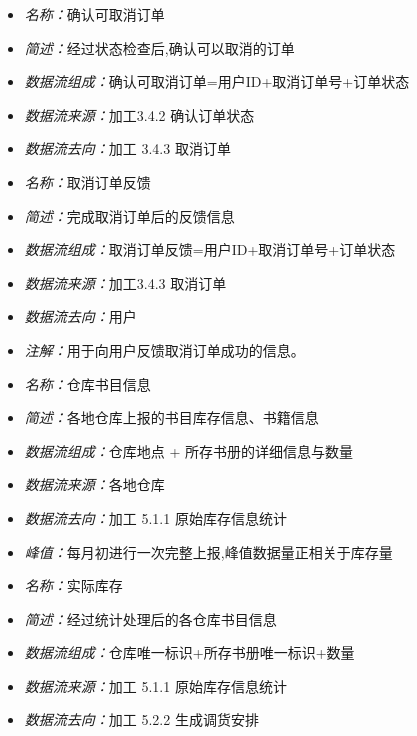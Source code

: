\documentclass{article}
\begin{document}
\begin{CJK*}{UTF8}{gbsn}
\vspace{-1mm}

\begin{itemize}
\item \textit{名称：}确认可取消订单
	\item \textit{简述：}经过状态检查后,确认可以取消的订单
	\item \textit{数据流组成：}确认可取消订单=用户ID+取消订单号+订单状态
	\item \textit{数据流来源：}加工3.4.2 确认订单状态
	\item \textit{数据流去向：}加工 3.4.3 取消订单
\end{itemize}

\vspace{-1mm}

\begin{itemize}
\item \textit{名称：}取消订单反馈
	\item \textit{简述：}完成取消订单后的反馈信息
	\item \textit{数据流组成：}取消订单反馈=用户ID+取消订单号+订单状态
	\item \textit{数据流来源：}加工3.4.3 取消订单
	\item \textit{数据流去向：}用户
	\item \textit{注解：}用于向用户反馈取消订单成功的信息。
\end{itemize}

\vspace{-1mm}

\begin{itemize}
\item \textit{名称：}仓库书目信息
	\item \textit{简述：}各地仓库上报的书目库存信息、书籍信息
	\item \textit{数据流组成：}仓库地点 + 所存书册的详细信息与数量
	\item \textit{数据流来源：}各地仓库
	\item \textit{数据流去向：}加工 5.1.1 原始库存信息统计
	\item \textit{峰值：}每月初进行一次完整上报,峰值数据量正相关于库存量
\end{itemize}

\vspace{-1mm}

\begin{itemize}
\item \textit{名称：}实际库存
	\item \textit{简述：}经过统计处理后的各仓库书目信息
	\item \textit{数据流组成：}仓库唯一标识+所存书册唯一标识+数量
	\item \textit{数据流来源：}加工 5.1.1 原始库存信息统计
	\item \textit{数据流去向：}加工 5.2.2 生成调货安排
\end{itemize}


\end{CJK*}
\end{document}
